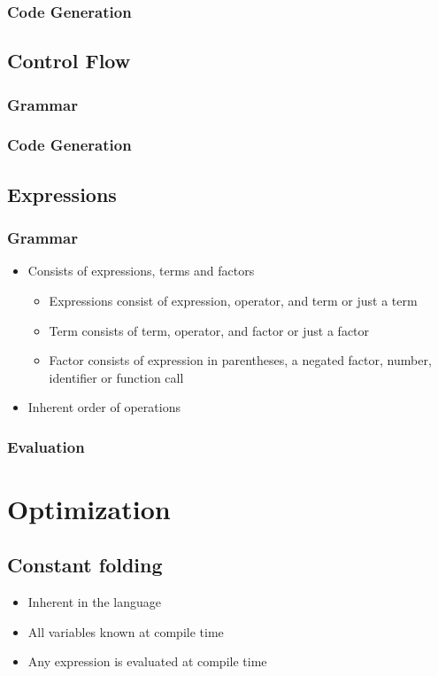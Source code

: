 \subsubsection{Code Generation}

\subsection{Control Flow}
\label{sec:control_flow}
\subsubsection{Grammar}
\subsubsection{Code Generation}

\subsection{Expressions}
\subsubsection{Grammar}
\begin{itemize}
    \item Consists of expressions, terms and factors
    \begin{itemize}
        \item Expressions consist of expression, operator, and term or just a term
        \item Term consists of term, operator, and factor or just a factor
        \item Factor consists of expression in parentheses, a negated factor, number, identifier or function call
    \end{itemize}
    \item Inherent order of operations
\end{itemize}
\subsubsection{Evaluation}

\section{Optimization}
\subsection{Constant folding}
\begin{itemize}
    \item Inherent in the language
    \item All variables known at compile time
    \item Any expression is evaluated at compile time
\end{itemize}
